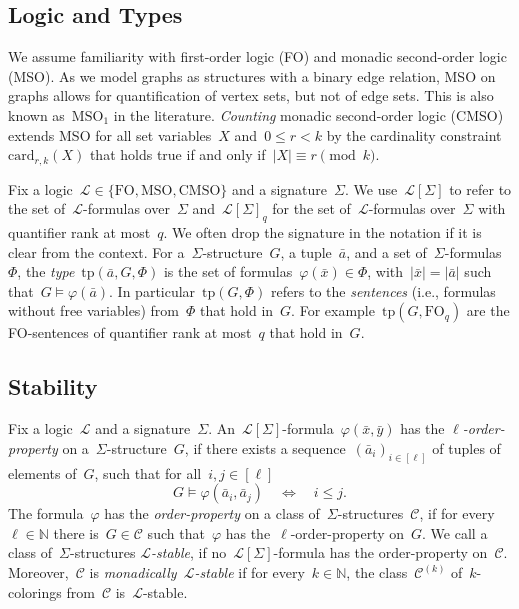 \documentclass[11pt]{article}      \usepackage[margin=1in]{geometry}  \usepackage{microtype}
\theoremstyle{definition}
\newcommand{\N}[0]{\mathrm{\mathbb{N}}}
\newcommand{\tp}{\mathrm{tp}}
\renewcommand{\phi}{\varphi}
\newcommand{\LL}{\mathcal{L}}
\newcommand{\FO}{\mathrm{FO}}
\newcommand{\MSO}{\mathrm{MSO}}
\newcommand{\CMSO}{\mathrm{CMSO}}
\newcommand{\CC}{\mathcal{C}}
\renewcommand{\le}{\leqslant}
\renewcommand{\leq}{\le}
\begin{document}
\subsection{Logic and Types}
We assume familiarity with first-order logic (FO) and monadic second-order logic (MSO).
As we model graphs as structures with a binary edge relation, MSO on graphs allows for quantification of vertex sets, but not of edge sets. This is also known as~$\MSO_1$ in the literature.
\emph{Counting} monadic second-order logic (CMSO) extends MSO for all set variables~$X$ and~$0 \leq r < k$ by the cardinality constraint~$\text{card}_{r,k}(X)$ that holds true if and only if~$|X| \equiv r \pmod k$.


Fix a logic~$\LL \in \{\FO,\MSO, \CMSO\}$ and a signature~$\Sigma$.
We use~$\LL[\Sigma]$ to refer to the set of~$\LL$-formulas over~$\Sigma$ and~$\LL[\Sigma]_q$
for the set of~$\LL$-formulas over~$\Sigma$ with quantifier rank at most~$q$.
We often drop the signature in the notation if it is clear from the context.
For a~$\Sigma$-structure~$G$, a tuple~$\bar a$, and a set of~$\Sigma$-formulas~$\Phi$, the \emph{type}~$\tp(\bar a, G, \Phi)$ is the set of formulas~$\phi(\bar x) \in \Phi$, with~$|\bar x| = |\bar a|$ such that~$G \models \phi(\bar a)$.
In particular~$\tp(G,\Phi)$ refers to the \emph{sentences}  (i.e., formulas without free variables) from~$\Phi$ that hold in~$G$. 
For example~$\tp(G,\FO_q)$ are the FO-sentences of quantifier rank at most~$q$ that hold in~$G$.

 



\subsection{Stability}
Fix a logic~$\LL$ and a signature~$\Sigma$.
An~$\LL[\Sigma]$-formula~$\phi(\bar x,\bar y)$ has the \emph{$\ell$-order-property} on a~$\Sigma$-structure~$G$, if there exists a sequence~$(\bar{a}_i)_{i \in [\ell]}$ 
of tuples of elements of~$G$, such that
for all~$i,j\in[\ell]$
  \[G \models \phi(\bar{a}_i,\bar{a}_j) \quad \Leftrightarrow \quad  i \leq j.\]
The formula~$\phi$ has the \emph{order-property} on a class of~$\Sigma$-structures~$\CC$, if  
for every~$\ell \in \N$ there is~$G \in \CC$ such that~$\phi$ has the~$\ell$-order-property on~$G$.
We call a class of~$\Sigma$-structures \emph{$\LL$-stable}, if no~$\LL[\Sigma]$-formula has the order-property on~$\CC$.
Moreover,~$\CC$ is \emph{monadically~$\LL$-stable} if for every~$k\in\N$, the class~$\CC^{(k)}$ of~$k$-colorings from~$\CC$ is~$\LL$-stable.
\end{document}
